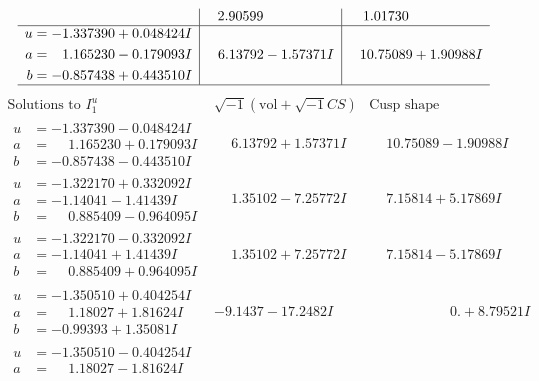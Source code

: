 \documentclass[1p]{elsarticle_modified}
\theoremstyle{definition}
\newcommand{\I}{\sqrt{-1}}
\begin{document}
$$\begin{array}{c|c|c}
 & \phantom{-}2.90599\phantom{ +0.000000I} & \phantom{-}1.01730\phantom{ +0.000000I} \\ \hline\begin{aligned}
u &= -1.337390 + 0.048424 I \\
a &= \phantom{-}1.165230 - 0.179093 I \\
b &= -0.857438 + 0.443510 I\end{aligned}
 & \phantom{-}6.13792 - 1.57371 I & \phantom{-}10.75089 + 1.90988 I\\
 \hline 
 \end{array}$$\newpage$$\begin{array}{c|c|c}  
\text{Solutions to }I^u_{1}& \I (\text{vol} + \sqrt{-1}CS) & \text{Cusp shape}\\
 \hline 
\begin{aligned}
u &= -1.337390 - 0.048424 I \\
a &= \phantom{-}1.165230 + 0.179093 I \\
b &= -0.857438 - 0.443510 I\end{aligned}
 & \phantom{-}6.13792 + 1.57371 I & \phantom{-}10.75089 - 1.90988 I \\ \hline\begin{aligned}
u &= -1.322170 + 0.332092 I \\
a &= -1.14041 - 1.41439 I \\
b &= \phantom{-}0.885409 - 0.964095 I\end{aligned}
 & \phantom{-}1.35102 - 7.25772 I & \phantom{-}7.15814 + 5.17869 I \\ \hline\begin{aligned}
u &= -1.322170 - 0.332092 I \\
a &= -1.14041 + 1.41439 I \\
b &= \phantom{-}0.885409 + 0.964095 I\end{aligned}
 & \phantom{-}1.35102 + 7.25772 I & \phantom{-}7.15814 - 5.17869 I \\ \hline\begin{aligned}
u &= -1.350510 + 0.404254 I \\
a &= \phantom{-}1.18027 + 1.81624 I \\
b &= -0.99393 + 1.35081 I\end{aligned}
 & -9.1437 - 17.2482 I & \phantom{-0.000000 -}0. + 8.79521 I \\ \hline\begin{aligned}
u &= -1.350510 - 0.404254 I \\
a &= \phantom{-}1.18027 - 1.81624 I \\

\end{aligned}
\end{array}$$
\end{document}
